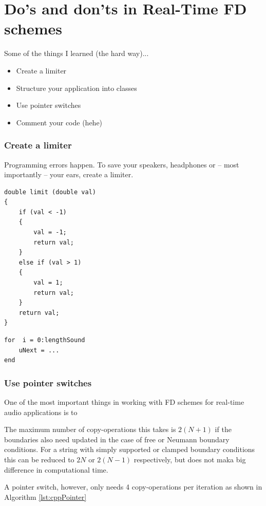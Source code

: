 \section{Do's and don'ts in Real-Time FD schemes}
Some of the things I learned (the hard way)...
\begin{itemize}
    \item Create a limiter
    \item Structure your application into classes 
    \item Use pointer switches
    \item Comment your code (hehe)
\end{itemize}

\subsubsection{Create a limiter}
Programming errors happen. To save your speakers, headphones or -- most importantly -- your ears, create a limiter. 

\setlstCpp
\begin{lstlisting}
double limit (double val)
{
    if (val < -1)
    {
        val = -1;
        return val;
    }
    else if (val > 1)
    {
        val = 1;
        return val;
    }
    return val;
}
\end{lstlisting}

\setlstMAT
\begin{lstlisting}
for  i = 0:lengthSound
    uNext = ...
end
\end{lstlisting}

\subsubsection{Use pointer switches}
One of the most important things in working with FD schemes for real-time audio applications is to 

The maximum number of copy-operations this takes is $2(N+1)$ if the boundaries also need updated in the case of free or Neumann boundary conditions. For a string with simply supported or clamped boundary conditions this can be reduced to $2N$ or $2(N-1)$ respectively, but does not maka big difference in computational time. 

A pointer switch, however, only needs 4 copy-operations per iteration as shown in Algorithm \ref{lst:cppPointer} 

